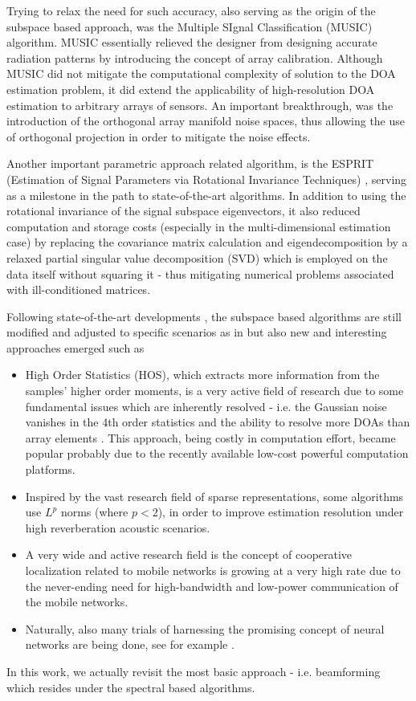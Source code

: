 \par
Trying to relax the need for such accuracy, also serving as the origin of the subspace based approach, was the Multiple SIgnal Classification (MUSIC) \cite{schmidt1986multiple} algorithm.
MUSIC essentially relieved the designer from designing accurate radiation patterns by introducing the concept of array calibration.
Although MUSIC did not mitigate the computational complexity of solution to the DOA estimation problem, it did extend the applicability of high-resolution DOA estimation to arbitrary arrays of sensors.
An important breakthrough, was the introduction of the orthogonal array manifold noise spaces, thus allowing the use of orthogonal projection in order to mitigate the noise effects.
\par
Another important parametric approach related algorithm, is the ESPRIT (Estimation of Signal Parameters via Rotational Invariance Techniques) \cite{ESPRIT}, serving as a milestone in the path to state-of-the-art algorithms.
In addition to using the rotational invariance of the signal subspace eigenvectors, it also reduced computation and storage costs (especially in the multi-dimensional estimation case) by replacing the covariance matrix calculation and eigendecomposition by a relaxed partial singular value decomposition (SVD) which is employed on the data itself without squaring it - thus mitigating numerical problems associated with ill-conditioned matrices.
\par
Following state-of-the-art developments \cite{tuncer2009classical}, the subspace based algorithms are still modified and adjusted to specific scenarios as in \cite{LpNorm_MUSIC} but also new and interesting approaches emerged such as
\begin{itemize}
    \item High Order Statistics (HOS), which extracts more information from the samples' higher order moments, is a very active field of research due to some fundamental issues which are inherently resolved - i.e. the Gaussian noise vanishes in the 4th order statistics and the ability to resolve more DOAs than array elements \cite{chevalier2006high}.
    This approach, being costly in computation effort, became popular probably due to the recently available low-cost powerful computation platforms.
    \item Inspired by the vast research field of sparse representations, some algorithms \cite{nadiri2014localization} use $L^{p}$ norms (where $p<2$), in order to improve estimation resolution under high reverberation acoustic scenarios.
    \item A very wide and active research field is the concept of cooperative localization related to mobile networks is growing at a very high rate due to the never-ending need for high-bandwidth and low-power communication of the mobile networks.
    \item Naturally, also many trials of harnessing the promising concept of neural networks are being done, see for example \cite{shareef2008localization}.
\end{itemize}
In this work, we actually revisit the most basic approach - i.e. beamforming which resides under the spectral based algorithms.